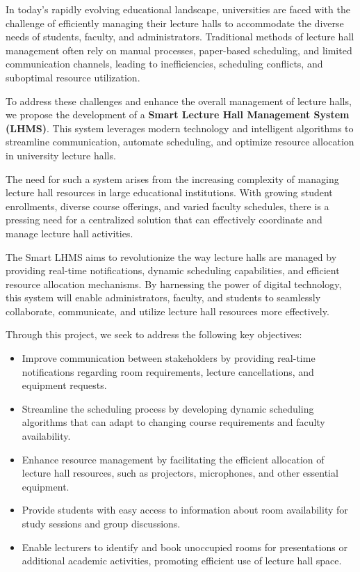 \documentclass[12pt]{article}
\begin{document}
In today's rapidly evolving educational landscape, universities are faced with the challenge of efficiently managing their lecture halls to accommodate the diverse needs of students, faculty, and administrators. Traditional methods of lecture hall management often rely on manual processes, paper-based scheduling, and limited communication channels, leading to inefficiencies, scheduling conflicts, and suboptimal resource utilization.

To address these challenges and enhance the overall management of lecture halls, we propose the development of a \textbf{Smart Lecture Hall Management System (LHMS)}. This system leverages modern technology and intelligent algorithms to streamline communication, automate scheduling, and optimize resource allocation in university lecture halls.

The need for such a system arises from the increasing complexity of managing lecture hall resources in large educational institutions. With growing student enrollments, diverse course offerings, and varied faculty schedules, there is a pressing need for a centralized solution that can effectively coordinate and manage lecture hall activities.

The Smart LHMS aims to revolutionize the way lecture halls are managed by providing real-time notifications, dynamic scheduling capabilities, and efficient resource allocation mechanisms. By harnessing the power of digital technology, this system will enable administrators, faculty, and students to seamlessly collaborate, communicate, and utilize lecture hall resources more effectively.


Through this project, we seek to address the following key objectives:
\begin{itemize}
    \item Improve communication between stakeholders by providing real-time notifications regarding room requirements, lecture cancellations, and equipment requests.
    \item Streamline the scheduling process by developing dynamic scheduling algorithms that can adapt to changing course requirements and faculty availability.
    \item Enhance resource management by facilitating the efficient allocation of lecture hall resources, such as projectors, microphones, and other essential equipment.
    \item Provide students with easy access to information about room availability for study sessions and group discussions.
    \item Enable lecturers to identify and book unoccupied rooms for presentations or additional academic activities, promoting efficient use of lecture hall space.
\end{itemize}
\end{document}
